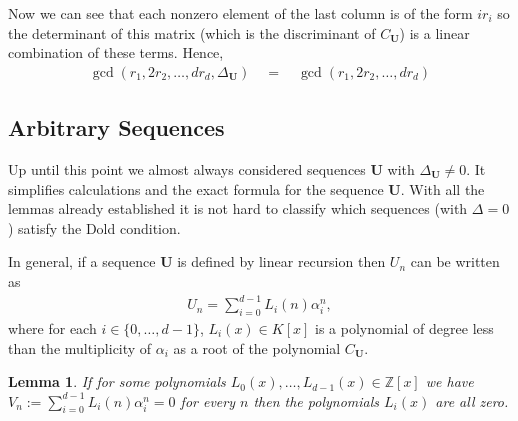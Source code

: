 \documentclass[preprint,12pt]{elsarticle}
\newcommand{\Z}{\mathbb{Z}}
\newtheorem{lemma}{Lemma}
\begin{document}
Now we can see that each nonzero element of the last column is of the form $ir_i$ so the determinant of this matrix (which is the discriminant of $C_\mathbf{U}$) is a linear combination of these terms. Hence,
\begin{align}
    \gcd\left(r_1,2r_2, \ldots , dr_d, \Delta_\mathbf{U}\right) 
    \quad = \quad   
    \gcd\left(r_1,2r_2, \ldots, dr_d\right)
\end{align}




\subsection{Arbitrary Sequences}

Up until this point we almost always considered sequences $\mathbf{U}$ with $\Delta_{\mathbf{U}} \not= 0$. It simplifies calculations and the exact formula for the sequence  $\mathbf{U}$. With all the lemmas already established it is not hard to classify which sequences (with $\Delta = 0$) satisfy the Dold condition. 

In general, if a sequence $\mathbf{U}$ is defined by linear recursion then $U_n$ can be written as
\begin{align}
    U_n = \sum_{i=0}^{d-1} L_i(n)\alpha_i^n,
\end{align}
where for each $i\in\{0,\ldots ,d-1\}$, $L_i(x) \in K[x]$ is a polynomial of degree less than the multiplicity of $\alpha_i$ as a root of the polynomial $C_{\mathbf{U}}$.


\begin{lemma}\label{lem_poly_zero}
    If for some polynomials $L_0(x), \ldots, L_{d-1}(x) \in \Z[x]$ we have\linebreak ${V_n} := \sum_{i=0}^{d-1}L_i(n)\alpha_i^n = 0$ for every $n$ then the polynomials $L_i(x)$ are all zero. 
\end{lemma}
\end{document}
